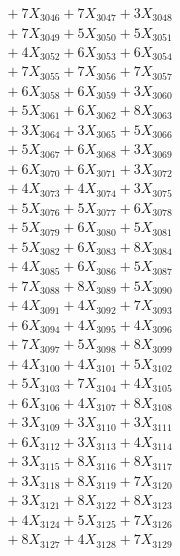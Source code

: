 \documentclass[a4paper,10pt]{article}
\begin{document}
{\begin{align}
&\;  + 7 X_{3046} + 7 X_{3047} + 3 X_{3048} \\[0.3ex]
&\;  + 7 X_{3049} + 5 X_{3050} + 5 X_{3051} \\[0.3ex]
&\;  + 4 X_{3052} + 6 X_{3053} + 6 X_{3054} \\[0.3ex]
&\;  + 7 X_{3055} + 7 X_{3056} + 7 X_{3057} \\[0.3ex]
&\;  + 6 X_{3058} + 6 X_{3059} + 3 X_{3060} \\[0.3ex]
&\;  + 5 X_{3061} + 6 X_{3062} + 8 X_{3063} \\[0.3ex]
&\;  + 3 X_{3064} + 3 X_{3065} + 5 X_{3066} \\[0.3ex]
&\;  + 5 X_{3067} + 6 X_{3068} + 3 X_{3069} \\[0.5ex]\allowbreak
&\;  + 6 X_{3070} + 6 X_{3071} + 3 X_{3072} \\[0.3ex]
&\;  + 4 X_{3073} + 4 X_{3074} + 3 X_{3075} \\[0.3ex]
&\;  + 5 X_{3076} + 5 X_{3077} + 6 X_{3078} \\[0.3ex]
&\;  + 5 X_{3079} + 6 X_{3080} + 5 X_{3081} \\[0.3ex]
&\;  + 5 X_{3082} + 6 X_{3083} + 8 X_{3084} \\[0.3ex]
&\;  + 4 X_{3085} + 6 X_{3086} + 5 X_{3087} \\[0.3ex]
&\;  + 7 X_{3088} + 8 X_{3089} + 5 X_{3090} \\[0.3ex]
&\;  + 4 X_{3091} + 4 X_{3092} + 7 X_{3093} \\[0.3ex]
&\;  + 6 X_{3094} + 4 X_{3095} + 4 X_{3096} \\[0.3ex]
&\;  + 7 X_{3097} + 5 X_{3098} + 8 X_{3099} \\[0.5ex]\allowbreak
&\;  + 4 X_{3100} + 4 X_{3101} + 5 X_{3102} \\[0.3ex]
&\;  + 5 X_{3103} + 7 X_{3104} + 4 X_{3105} \\[0.3ex]
&\;  + 6 X_{3106} + 4 X_{3107} + 8 X_{3108} \\[0.3ex]
&\;  + 3 X_{3109} + 3 X_{3110} + 3 X_{3111} \\[0.3ex]
&\;  + 6 X_{3112} + 3 X_{3113} + 4 X_{3114} \\[0.3ex]
&\;  + 3 X_{3115} + 8 X_{3116} + 8 X_{3117} \\[0.3ex]
&\;  + 3 X_{3118} + 8 X_{3119} + 7 X_{3120} \\[0.3ex]
&\;  + 3 X_{3121} + 8 X_{3122} + 8 X_{3123} \\[0.3ex]
&\;  + 4 X_{3124} + 5 X_{3125} + 7 X_{3126} \\[0.3ex]
&\;  + 8 X_{3127} + 4 X_{3128} + 7 X_{3129} \\[0.5ex]\allowbreak

\end{align}}
\end{document}
